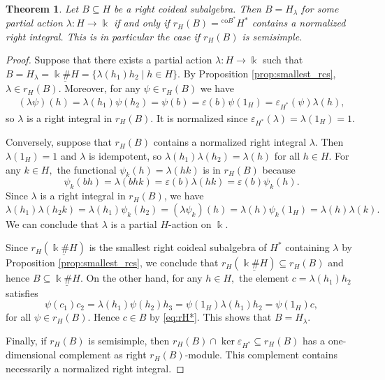 \documentclass[reqno]{amsart}
\newtheorem{theorem}[thm]{Theorem}
\theoremstyle{definition}
\numberwithin{equation}{section}\theoremstyle{plain}
\theoremstyle{definition}
\def \k {\Bbbk}
\begin{document}
    \begin{theorem}
        \label{semisimple}
        Let \(B \subseteq H\) be a right coideal subalgebra. Then \(B = H_\lambda\) for some partial action \(\lambda : H \to \k\) if and only if \(r_H(B) = {^{\mathrm{co} B^*}} H^*\) contains a normalized right integral. This is in particular the case if \(r_H(B)\) is semisimple. 
    \end{theorem}
    \begin{proof}
        Suppose that there exists a partial action \(\lambda : H \to \k\) such that
        \(B = H_\lambda = \underline{\k \# H} = \{\lambda(h_1) h_2 \mid h \in H\}\). 
        By Proposition \ref{prop:smallest_rcs}, \(\lambda \in r_H(B)\).
        Moreover, for any \(\psi \in r_H(B)\) we have
        \begin{align*}
            (\lambda \psi)(h) = \lambda(h_1) \psi(h_2) = \psi(b) = \varepsilon(b) \psi(1_H) = \varepsilon_{H^*}(\psi) \lambda(h),
        \end{align*}
        so \(\lambda\) is a right integral in \(r_H(B)\). It is normalized since \(\varepsilon_{H^*}(\lambda) = \lambda(1_H) = 1\).

        Conversely, suppose that \(r_H(B)\) contains a normalized right integral \(\lambda\). Then \(\lambda(1_H) = 1\) and \(\lambda\) is idempotent, so \(\lambda(h_1) \lambda(h_2) = \lambda(h)\) for all \(h \in H\). For any \(k \in H,\) the functional \(\psi_k(h) = \lambda(hk)\) is in \(r_H(B)\) because
        \[\psi_k(bh) = \lambda(bhk) = \varepsilon(b) \lambda(hk) = \varepsilon(b) \psi_k(h).\]
        Since \(\lambda\) is a right integral in \(r_H(B)\), we have
        \[\lambda(h_1) \lambda(h_2k) = \lambda(h_1) \psi_k(h_2) = (\lambda \psi_k)(h) = \lambda(h) \psi_k(1_H) = \lambda(h) \lambda(k).\]
        We can conclude that \(\lambda\) is a partial \(H\)-action on \(\k\). 

        Since \(r_H(\underline{\k \# H})\) is the smallest right coideal subalgebra of \(H^*\) containing \(\lambda\) by Proposition \ref{prop:smallest_rcs}, we conclude that \(r_H(\underline{\k \# H}) \subseteq r_H(B)\) and hence \(B \subseteq \underline{\k \# H}\).
        On the other hand, for any \(h \in H,\) the element \(c= \lambda(h_1) h_2\) satisfies
        \[\psi(c_1) c_2 = \lambda(h_1) \psi(h_2) h_3 = \psi(1_H) \lambda(h_1) h_2 = \psi(1_H) c,\]
        for all \(\psi \in r_H(B)\). Hence \(c \in B\) by \eqref{eq:rH*}. This shows that \(B = H_\lambda\).

        Finally, if \(r_H(B)\) is semisimple, then \(r_H(B) \cap \ker \varepsilon_{H^*} \subseteq r_H(B)\) has a one-dimensional complement as right \(r_H(B)\)-module. This complement contains necessarily a normalized right integral. 
    \end{proof}
\end{document}
